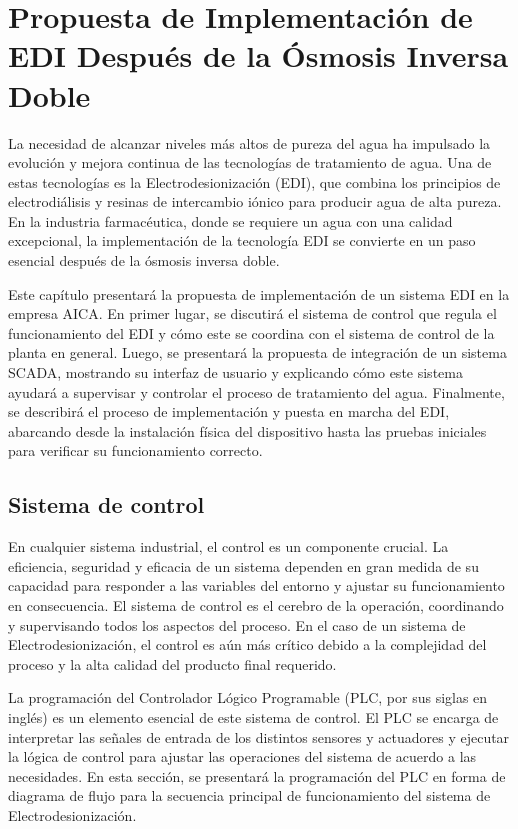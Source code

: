 \chapter{Propuesta de Implementación de EDI Después de la Ósmosis Inversa Doble}
\label{cap:propuesta_implementacion}

La necesidad de alcanzar niveles más altos de pureza del agua ha impulsado
la evolución y mejora continua de las tecnologías de tratamiento de agua.
Una de estas tecnologías es la Electrodesionización (EDI), que combina
los principios de electrodiálisis y resinas de intercambio iónico para
producir agua de alta pureza. En la industria farmacéutica, donde se
requiere un agua con una calidad excepcional, la implementación de la
tecnología EDI se convierte en un paso esencial después de la ósmosis inversa doble.

Este capítulo presentará la propuesta de implementación de un sistema
EDI en la empresa AICA. En primer lugar, se discutirá el sistema de
control que regula el funcionamiento del EDI y cómo este se coordina
con el sistema de control de la planta en general.
Luego, se presentará la propuesta de integración de un sistema SCADA,
mostrando su interfaz de usuario y explicando cómo este sistema
ayudará a supervisar y controlar el proceso de tratamiento del agua.
Finalmente, se describirá el proceso de implementación y puesta en marcha del
EDI, abarcando desde la instalación física del dispositivo hasta las pruebas
iniciales para verificar su funcionamiento correcto.

\section{Sistema de control}
\label{sec:sistema_control}

En cualquier sistema industrial, el control es un componente crucial. La eficiencia, seguridad y eficacia de un sistema dependen en gran medida de su capacidad para responder a las variables del entorno y ajustar su funcionamiento en consecuencia. El sistema de control es el cerebro de la operación, coordinando y supervisando todos los aspectos del proceso. En el caso de un sistema de Electrodesionización, el control es aún más crítico debido a la complejidad del proceso y la alta calidad del producto final requerido.

La programación del Controlador Lógico Programable (PLC, por sus siglas en inglés) es un elemento esencial de este sistema de control. El PLC se encarga de interpretar las señales de entrada de los distintos sensores y actuadores y ejecutar la lógica de control para ajustar las operaciones del sistema de acuerdo a las necesidades. En esta sección, se presentará la programación del PLC en forma de diagrama de flujo para la secuencia principal de funcionamiento del sistema de Electrodesionización.

